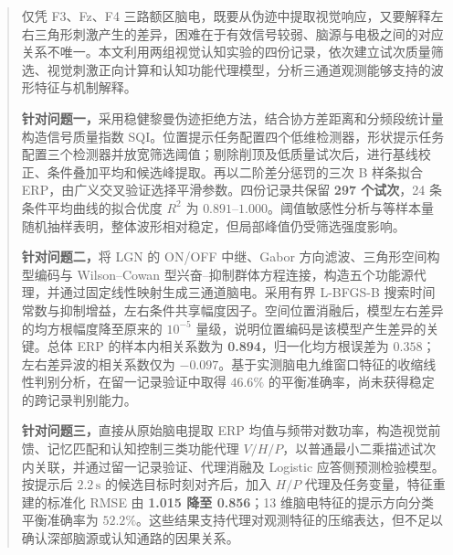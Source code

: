 

\begin{abstract}
仅凭 F3、Fz、F4 三路额区脑电，既要从伪迹中提取视觉响应，又要解释左右三角形刺激产生的差异，困难在于有效信号较弱、脑源与电极之间的对应关系不唯一。本文利用两组视觉认知实验的四份记录，依次建立试次质量筛选、视觉刺激正向计算和认知功能代理模型，分析三通道观测能够支持的波形特征与机制解释。

\textbf{针对问题一，}采用稳健黎曼伪迹拒绝方法，结合协方差距离和分频段统计量构造信号质量指数 SQI。位置提示任务配置四个低维检测器，形状提示任务配置三个检测器并放宽筛选阈值；剔除削顶及低质量试次后，进行基线校正、条件叠加平均和候选峰提取。再以二阶差分惩罚的三次 B 样条拟合 ERP，由广义交叉验证选择平滑参数。四份记录共保留 \textbf{297 个试次}，24 条条件平均曲线的拟合优度 \(R^2\) 为 \(0.891\)--\(1.000\)。阈值敏感性分析与等样本量随机抽样表明，整体波形相对稳定，但局部峰值仍受筛选强度影响。

\textbf{针对问题二，}将 LGN 的 ON/OFF 中继、Gabor 方向滤波、三角形空间构型编码与 Wilson--Cowan 型兴奋--抑制群体方程连接，构造五个功能源代理，并通过固定线性映射生成三通道脑电。采用有界 L-BFGS-B 搜索时间常数与抑制增益，左右条件共享幅度因子。空间位置消融后，模型左右差异的均方根幅度降至原来的 \(10^{-5}\) 量级，说明位置编码是该模型产生差异的关键。总体 ERP 的样本内相关系数为 \textbf{0.894}，归一化均方根误差为 \(0.358\)；左右差异波的相关系数仅为 \(-0.097\)。基于实测脑电九维窗口特征的收缩线性判别分析，在留一记录验证中取得 \(46.6\%\) 的平衡准确率，尚未获得稳定的跨记录判别能力。

\textbf{针对问题三，}直接从原始脑电提取 ERP 均值与频带对数功率，构造视觉前馈、记忆匹配和认知控制三类功能代理 \(V/H/P\)，以普通最小二乘描述试次内关联，并通过留一记录验证、代理消融及 Logistic 应答侧预测检验模型。按提示后 \(2.2\,\mathrm{s}\) 的候选目标时刻对齐后，加入 \(H/P\) 代理及任务变量，特征重建的标准化 RMSE 由 \textbf{1.015 降至 0.856}；13 维脑电特征的提示方向分类平衡准确率为 \(52.2\%\)。这些结果支持代理对观测特征的压缩表达，但不足以确认深部脑源或认知通路的因果关系。

\end{abstract}

